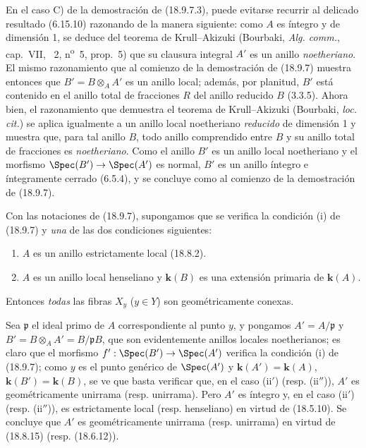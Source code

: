 \begin{remark}[18.9.7.8]
\label{IV.18.9.7.8}
En el caso C) de la demostración de (18.9.7.3), puede evitarse recurrir al delicado resultado (6.15.10) razonando de la manera siguiente: como $A$ es íntegro y de dimensión 1, se deduce del teorema de Krull--Akizuki (Bourbaki, \emph{Alg. comm.}, cap.~VII, \textsection~2, n\textsuperscript{o}~5, prop.~5) que su clausura integral $A'$ es un anillo \emph{noetheriano}. El mismo razonamiento que al comienzo de la demostración de (18.9.7) muestra entonces que $B'=B\otimes_A A'$ es un anillo local; además, por planitud, $B'$ está contenido en el anillo total de fracciones $R$ del anillo reducido $B$ (3.3.5). Ahora bien, el razonamiento que demuestra el teorema de Krull--Akizuki (Bourbaki, \emph{loc. cit.}) se aplica igualmente a un anillo local noetheriano \emph{reducido} de dimensión 1 y muestra que, para tal anillo $B$, todo anillo comprendido entre $B$ y su anillo total de fracciones es \emph{noetheriano}. Como el anillo $B'$ es un anillo local noetheriano y el morfismo $\Spec(B')\to\Spec(A')$ es normal, $B'$ es un anillo íntegro e íntegramente cerrado (6.5.4), y se concluye como al comienzo de la demostración de (18.9.7).
\end{remark}

\begin{corollary}[18.9.8]
\label{IV.18.9.8}
Con las notaciones de \textup{(18.9.7)}, supongamos que se verifica la condición \textup{(i)} de \textup{(18.9.7)} y \emph{una} de las dos condiciones siguientes:
\begin{enumerate}
  \item[\textup{(ii$'$)}] $A$ es un anillo estrictamente local \textup{(18.8.2)}.
  \item[\textup{(ii$''$)}] $A$ es un anillo local henseliano y $\boldsymbol{k}(B)$ es una extensión primaria de $\boldsymbol{k}(A)$.
\end{enumerate}
Entonces \emph{todas} las fibras $X_y$ \textup{($y\in Y$)} son geométricamente conexas.
\end{corollary}

Sea $\mathfrak p$ el ideal primo de $A$ correspondiente al punto $y$, y pongamos $A'=A/\mathfrak p$ y $B'=B\otimes_A A'=B/\mathfrak pB$, que son evidentemente anillos locales noetherianos; es claro que el morfismo $f':\Spec(B')\to\Spec(A')$ verifica la condición (i) de (18.9.7); como $y$ es el punto genérico de $\Spec(A')$ y $\boldsymbol{k}(A')=\boldsymbol{k}(A)$, $\boldsymbol{k}(B')=\boldsymbol{k}(B)$, se ve que basta verificar que, en el caso (ii$'$) (resp. (ii$''$)), $A'$ es geométricamente unirrama (resp. unirrama). Pero $A'$ es íntegro y, en el caso (ii$'$) (resp. (ii$''$)), es estrictamente local (resp. henseliano) en virtud de (18.5.10). Se concluye que $A'$ es geométricamente unirrama (resp. unirrama) en virtud de (18.8.15) (resp. (18.6.12)).

